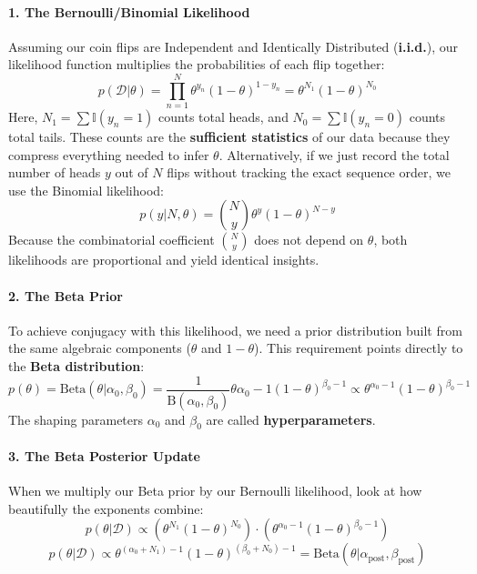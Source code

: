 \documentclass{article}
\begin{document}
\paragraph{1. The Bernoulli/Binomial Likelihood}
Assuming our coin flips are Independent and Identically Distributed (\textbf{i.i.d.}), our likelihood function multiplies the probabilities of each flip together:
\begin{equation}
p(\mathcal{D}|\theta) = \prod_{n=1}^N \theta^{y_n}(1-\theta)^{1-y_n} = \theta^{N_1}(1-\theta)^{N_0}
\end{equation}
Here, $N_1 = \sum \mathbb{I}(y_n=1)$ counts total heads, and $N_0 = \sum \mathbb{I}(y_n=0)$ counts total tails. These counts are the \textbf{sufficient statistics} of our data because they compress everything needed to infer $\theta$. Alternatively, if we just record the total number of heads $y$ out of $N$ flips without tracking the exact sequence order, we use the Binomial likelihood:
\begin{equation}
p(y|N, \theta) = \binom{N}{y}\theta^y(1-\theta)^{N-y}
\end{equation}
Because the combinatorial coefficient $\binom{N}{y}$ does not depend on $\theta$, both likelihoods are proportional and yield identical insights.

\paragraph{2. The Beta Prior}
To achieve conjugacy with this likelihood, we need a prior distribution built from the same algebraic components ($\theta$ and $1-\theta$). This requirement points directly to the \textbf{Beta distribution}:
\begin{equation}
p(\theta) = \text{Beta}(\theta|\alpha_0, \beta_0) = \frac{1}{\text{B}(\alpha_0, \beta_0)}\theta{\alpha_0-1}(1-\theta)^{\beta_0-1} \propto \theta^{\alpha_0-1}(1-\theta)^{\beta_0-1}
\end{equation}
The shaping parameters $\alpha_0$ and $\beta_0$ are called \textbf{hyperparameters}.

\paragraph{3. The Beta Posterior Update}
When we multiply our Beta prior by our Bernoulli likelihood, look at how beautifully the exponents combine:
\begin{equation}
p(\theta|\mathcal{D}) \propto \left(\theta^{N_1}(1-\theta)^{N_0}\right) \cdot \left(\theta^{\alpha_0-1}(1-\theta)^{\beta_0-1}\right)
\end{equation}
\begin{equation}
p(\theta|\mathcal{D}) \propto \theta^{(\alpha_0 + N_1) - 1}(1-\theta)^{(\beta_0 + N_0) - 1} = \text{Beta}(\theta|\alpha_{\text{post}}, \beta_{\text{post}})
\end{equation}
\end{document}
